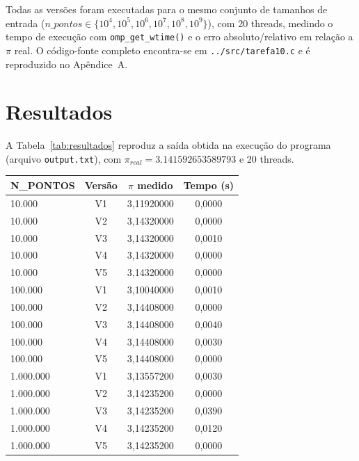 \documentclass[a4paper,12pt]{article}
\begin{document}
Todas as versões foram executadas para o mesmo conjunto de tamanhos de
entrada ($n\_pontos \in \{10^4, 10^5, 10^6, 10^7, 10^8, 10^9\}$), com
20 threads, medindo o tempo de execução com \texttt{omp\_get\_wtime()}
e o erro absoluto/relativo em relação a $\pi$ real. O código-fonte
completo encontra-se em \texttt{../src/tarefa10.c} e é reproduzido no
Apêndice~A.

\section{Resultados}

A Tabela~\ref{tab:resultados} reproduz a saída obtida na execução do
programa (arquivo \texttt{output.txt}), com $\pi_{real} = 3.141592653589793$
e 20 threads.

\begin{table}[H]
\centering

\begin{tabular}{lccc}
\toprule
\textbf{N\_PONTOS} & \textbf{Versão} & \textbf{$\pi$ medido} & \textbf{Tempo (s)} \\
\midrule

10.000          & V1 & 3,11920000 & 0,0000 \\
10.000          & V2 & 3,14320000 & 0,0000 \\
10.000          & V3 & 3,14320000 & 0,0010 \\
10.000          & V4 & 3,14320000 & 0,0000 \\
10.000          & V5 & 3,14320000 & 0,0000 \\
\midrule

100.000         & V1 & 3,10040000 & 0,0010 \\
100.000         & V2 & 3,14408000 & 0,0000 \\
100.000         & V3 & 3,14408000 & 0,0040 \\
100.000         & V4 & 3,14408000 & 0,0030 \\
100.000         & V5 & 3,14408000 & 0,0000 \\
\midrule

1.000.000       & V1 & 3,13557200 & 0,0030 \\
1.000.000       & V2 & 3,14235200 & 0,0000 \\
1.000.000       & V3 & 3,14235200 & 0,0390 \\
1.000.000       & V4 & 3,14235200 & 0,0120 \\
1.000.000       & V5 & 3,14235200 & 0,0000 \\
\midrule


\end{tabular}
\end{table}
\end{document}
